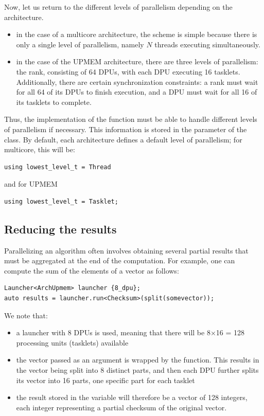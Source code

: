 Now, let us return to the different levels of parallelism depending on the architecture.

\begin{itemize}
	\item in the case of a multicore architecture, the scheme is simple because there is only a single level of parallelism, 
	namely $N$ threads executing simultaneously.
	\item in the case of the UPMEM architecture, there are three levels of parallelism: the rank, consisting of 64 DPUs, 
	with each DPU executing 16 tasklets. Additionally, there are certain synchronization constraints: 
	a rank must wait for all 64 of its DPUs to finish execution, and a DPU must wait for all 16 of its tasklets to complete.
\end{itemize}

Thus, the implementation of the  function must be able to handle different levels of parallelism if necessary.  This information is stored in the  parameter of the  class. By default, each architecture  defines a default level of parallelism; for multicore, this will be:

\begin{verbatim}
using lowest_level_t = Thread
\end{verbatim}
and for UPMEM
\begin{verbatim}
using lowest_level_t = Tasklet;
\end{verbatim}

\subsection{Reducing the results}

Parallelizing an algorithm often involves obtaining several partial results that must be aggregated at the end of the computation.  For example, one can compute the sum of the elements of a vector as follows:

\begin{verbatim}
Launcher<ArchUpmem> launcher {8_dpu};
auto results = launcher.run<Checksum>(split(somevector));
\end{verbatim}

We note that:

\begin{itemize}
\item a launcher with 8 DPUs is used, meaning that there will be 8×16 = 128 processing units (tasklets) available
\item the vector passed as an argument is wrapped by the  function. This results in the vector being split 
into 8 distinct parts, and then each DPU further splits its vector into 16 parts, one specific part for each tasklet
\item the result stored in the  variable will therefore be a vector of 128 integers, each integer representing
 a partial checksum of the original vector.
\end{itemize}

